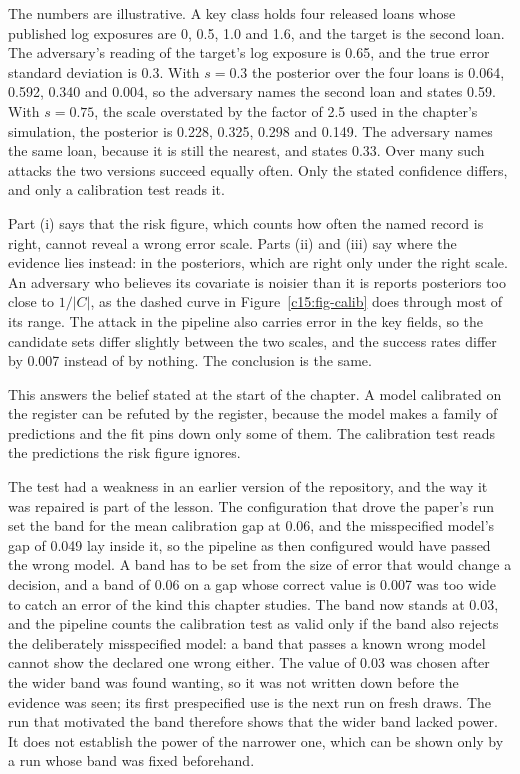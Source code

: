 \begin{example}\label{c15:ex-scales}
The numbers are illustrative. A key class holds four released loans whose published log
exposures are 0, 0.5, 1.0 and 1.6, and the target is the second loan. The adversary's
reading of the target's log exposure is 0.65, and the true error standard deviation is
0.3. With $s = 0.3$ the posterior over the four loans is 0.064, 0.592, 0.340 and 0.004,
so the adversary names the second loan and states 0.59. With $s = 0.75$, the scale
overstated by the factor of 2.5 used in the chapter's simulation, the posterior is 0.228,
0.325, 0.298 and 0.149. The adversary names the same loan, because it is still the
nearest, and states 0.33. Over many such attacks the two versions succeed equally often.
Only the stated confidence differs, and only a calibration test reads it.
\end{example}

Part (i) says that the risk figure, which counts how often the named record is
right, cannot reveal a wrong error scale. Parts (ii) and (iii) say where the
evidence lies instead: in the posteriors, which are right only under the right
scale. An adversary who believes its covariate is noisier than it is reports
posteriors too close to $1/|C|$, as the dashed curve in Figure~\ref{c15:fig-calib}
does through most of its range. The attack in the pipeline also carries error in
the key fields, so the candidate sets differ slightly between the two scales, and
the success rates differ by 0.007 instead of by nothing. The conclusion is the same.

This answers the belief stated at the start of the chapter. A model calibrated on
the register can be refuted by the register, because the model makes a family of
predictions and the fit pins down only some of them. The calibration test reads
the predictions the risk figure ignores.

The test had a weakness in an earlier version of the repository, and the way it was
repaired is part of the lesson. The configuration that drove the paper's run set the band
for the mean calibration gap at 0.06, and the misspecified model's gap of 0.049 lay inside
it, so the pipeline as then configured would have passed the wrong model. A band has to be
set from the size of error that would change a decision, and a band of 0.06 on a gap whose
correct value is 0.007 was too wide to catch an error of the kind this chapter studies. The
band now stands at 0.03, and the pipeline counts the calibration test as valid only if the
band also rejects the deliberately misspecified model: a band that passes a known wrong
model cannot show the declared one wrong either.
The value of 0.03 was chosen after the wider band was found wanting, so it was not written down
before the evidence was seen; its first prespecified use is the next run on fresh draws. The run that motivated the
band therefore shows that the wider band lacked power. It does not establish the power
of the narrower one, which can be shown only by a run whose band was fixed beforehand.

